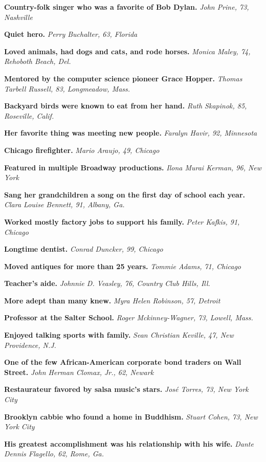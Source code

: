 \textbf{Country-folk singer who was a favorite of Bob Dylan.} \emph{John
Prine, 73, Nashville}

\textbf{Quiet hero.} \emph{Perry Buchalter, 63, Florida}

\textbf{Loved animals, had dogs and cats, and rode horses.} \emph{Monica
Maley, 74, Rehoboth Beach, Del.}

\textbf{Mentored by the computer science pioneer Grace Hopper.}
\emph{Thomas Tarbell Russell, 83, Longmeadow, Mass.}

\textbf{Backyard birds were known to eat from her hand.} \emph{Ruth
Skapinok, 85, Roseville, Calif.}

\textbf{Her favorite thing was meeting new people.} \emph{Faralyn Havir,
92, Minnesota}

\textbf{Chicago firefighter.} \emph{Mario Araujo, 49, Chicago}

\textbf{Featured in multiple Broadway productions.} \emph{Ilona Murai
Kerman, 96, New York}

\textbf{Sang her grandchildren a song on the first day of school each
year.} \emph{Clara Louise Bennett, 91, Albany, Ga.}

\textbf{Worked mostly factory jobs to support his family.} \emph{Peter
Kafkis, 91, Chicago}

\textbf{Longtime dentist.} \emph{Conrad Duncker, 99, Chicago}

\textbf{Moved antiques for more than 25 years.} \emph{Tommie Adams, 71,
Chicago}

\textbf{Teacher's aide.} \emph{Johnnie D. Veasley, 76, Country Club
Hills, Ill.}

\textbf{More adept than many knew.} \emph{Myra Helen Robinson, 57,
Detroit}

\textbf{Professor at the Salter School.} \emph{Roger Mckinney-Wagner,
73, Lowell, Mass.}

\textbf{Enjoyed talking sports with family.} \emph{Sean Christian
Keville, 47, New Providence, N.J.}

\textbf{One of the few African-American corporate bond traders on Wall
Street.} \emph{John Herman Clomax, Jr., 62, Newark}

\textbf{Restaurateur favored by salsa music's stars.} \emph{José Torres,
73, New York City}

\textbf{Brooklyn cabbie who found a home in Buddhism.} \emph{Stuart
Cohen, 73, New York City}

\textbf{His greatest accomplishment was his relationship with his wife.}
\emph{Dante Dennis Flagello, 62, Rome, Ga.}

